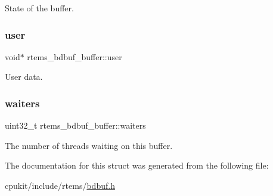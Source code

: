 State of the buffer. \mbox{\label{structrtems__bdbuf__buffer_a822b3c32a9b3042cbdf5632824d19c62}} 
\subsubsection{\texorpdfstring{user}{user}}
{\footnotesize\ttfamily void$\ast$ rtems\+\_\+bdbuf\+\_\+buffer\+::user}

User data. \mbox{\label{structrtems__bdbuf__buffer_a1b1faa7c6d016c8c66a0c620a2908f6f}} 
\subsubsection{\texorpdfstring{waiters}{waiters}}
{\footnotesize\ttfamily uint32\+\_\+t rtems\+\_\+bdbuf\+\_\+buffer\+::waiters}

The number of threads waiting on this buffer. 

The documentation for this struct was generated from the following file\+:\begin{DoxyCompactItemize}
\item 
cpukit/include/rtems/\mbox{\hyperlink{bdbuf_8h}{bdbuf.\+h}}\end{DoxyCompactItemize}
